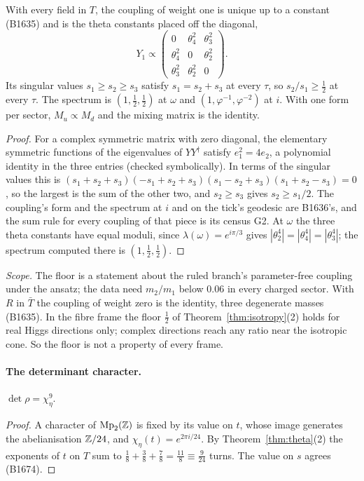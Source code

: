 \begin{corollary}\label{cor:halffloor}
With every field in $T$, the coupling of weight one is unique up to a constant (B1635) and is the theta constants placed
off the diagonal,
\[
  Y_1\propto\begin{pmatrix}0&\theta_4^2&\theta_3^2\\ \theta_4^2&0&\theta_2^2\\ \theta_3^2&\theta_2^2&0\end{pmatrix}.
\]
Its singular values $s_1\ge s_2\ge s_3$ satisfy $s_1=s_2+s_3$ at every $\tau$, so $s_2/s_1\ge\tfrac12$ at every
$\tau$. The spectrum is $(1,\tfrac12,\tfrac12)$ at $\omega$ and $(1,\varphi^{-1},\varphi^{-2})$ at $i$. With one form per
sector, $M_u\propto M_d$ and the mixing matrix is the identity.
\end{corollary}
\begin{proof}
For a complex symmetric matrix with zero diagonal, the elementary symmetric functions of the eigenvalues of $YY^\dagger$
satisfy $e_1^2=4e_2$, a polynomial identity in the three entries (checked symbolically). In terms of the singular values
this is $(s_1+s_2+s_3)(-s_1+s_2+s_3)(s_1-s_2+s_3)(s_1+s_2-s_3)=0$, so the largest is the sum of the other two, and
$s_2\ge s_3$ gives $s_2\ge s_1/2$. The coupling's form and the spectrum at $i$ and on the tick's geodesic are B1636's,
and the sum rule for every coupling of that piece is its census G2. At $\omega$ the three theta constants have equal
moduli, since $\lambda(\omega)=e^{i\pi/3}$ gives $|\theta_2^4|=|\theta_4^4|=|\theta_3^4|$; the spectrum computed there
is $(1,\tfrac12,\tfrac12)$.
\end{proof}
\noindent\emph{Scope.} The floor is a statement about the ruled branch's parameter-free coupling under the ansatz; the
data need $m_2/m_1$ below $0.06$ in every charged sector. With $R$ in $\bar T$ the coupling of weight zero is the
identity, three degenerate masses (B1635). In the fibre frame the floor $\tfrac12$ of Theorem~\ref{thm:isotropy}(2)
holds for real Higgs directions only; complex directions reach any ratio near the isotropic cone. So the floor is not a
property of every frame.

\paragraph{The determinant character.}
\begin{proposition}\label{prop:detchar}
$\det\rho=\chi_\eta^{9}$.
\end{proposition}
\begin{proof}
A character of $\mathrm{Mp}_2(\mathbb{Z})$ is fixed by its value on $t$, whose image generates the abelianisation $\mathbb{Z}/24$, and
$\chi_\eta(t)=e^{2\pi i/24}$. By Theorem~\ref{thm:theta}(2) the exponents of $t$ on $T$ sum to $\tfrac18+\tfrac38+\tfrac78
=\tfrac{11}8\equiv\tfrac{9}{24}$ turns. The value on $s$ agrees (B1674).
\end{proof}

